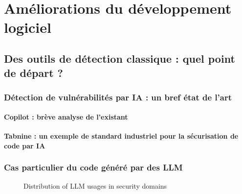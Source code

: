 \chapter{Améliorations du développement logiciel}
    \section{Des outils de détection classique : quel point de départ ?}
        \subsection{Détection de vulnérabilités par IA : un bref état de l'art}
            \subsubsection{Copilot : brève analyse de l'existant}
            \subsubsection{Tabnine : un exemple de standard industriel pour la sécurisation de code par IA}
        \subsection{Cas particulier du code généré par des LLM}
                \begin{figure}[H]
                    \centering
                    {}
                    \caption{Distribution of LLM usages in security domains \cite{citing4}}
                \end{figure}
